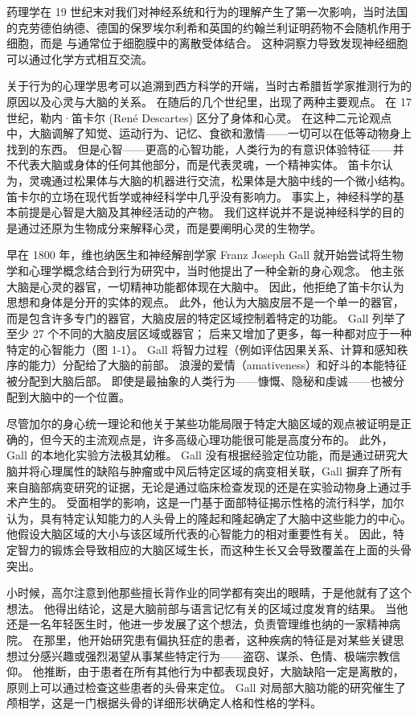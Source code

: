 药理学在 19 世纪末对我们对神经系统和行为的理解产生了第一次影响，当时法国的克劳德伯纳德、德国的保罗埃尔利希和英国的约翰兰利证明药物不会随机作用于细胞，而是 与通常位于细胞膜中的离散受体结合。 
这种洞察力导致发现神经细胞可以通过化学方式相互交流。


关于行为的心理学思考可以追溯到西方科学的开端，当时古希腊哲学家推测行为的原因以及心灵与大脑的关系。
在随后的几个世纪里，出现了两种主要观点。 
在 17 世纪，勒内·笛卡尔 (René Descartes) 区分了身体和心灵。 
在这种二元论观点中，大脑调解了知觉、运动行为、记忆、食欲和激情——一切可以在低等动物身上找到的东西。
但是心智——更高的心智功能，人类行为的有意识体验特征——并不代表大脑或身体的任何其他部分，而是代表灵魂，一个精神实体。 
笛卡尔认为，灵魂通过松果体与大脑的机器进行交流，松果体是大脑中线的一个微小结构。 
笛卡尔的立场在现代哲学或神经科学中几乎没有影响力。 事实上，神经科学的基本前提是心智是大脑及其神经活动的产物。 
我们这样说并不是说神经科学的目的是通过还原为生物成分来解释心灵，而是要阐明心灵的生物学。


早在 1800 年，维也纳医生和神经解剖学家 Franz Joseph Gall 就开始尝试将生物学和心理学概念结合到行为研究中，当时他提出了一种全新的身心观念。 
他主张大脑是心灵的器官，一切精神功能都体现在大脑中。 
因此，他拒绝了笛卡尔认为思想和身体是分开的实体的观点。 
此外，他认为大脑皮层不是一个单一的器官，而是包含许多专门的器官，大脑皮层的特定区域控制着特定的功能。 
Gall 列举了至少 27 个不同的大脑皮层区域或器官； 后来又增加了更多，每一种都对应于一种特定的心智能力（图 1-1）。 
Gall 将智力过程（例如评估因果关系、计算和感知秩序的能力）分配给了大脑的前部。 
浪漫的爱情（amativeness）和好斗的本能特征被分配到大脑后部。 
即使是最抽象的人类行为——慷慨、隐秘和虔诚——也被分配到大脑中的一个位置。


尽管加尔的身心统一理论和他关于某些功能局限于特定大脑区域的观点被证明是正确的，但今天的主流观点是，许多高级心理功能很可能是高度分布的。 
此外，Gall 的本地化实验方法极其幼稚。 
Gall 没有根据经验定位功能，而是通过研究大脑并将心理属性的缺陷与肿瘤或中风后特定区域的病变相关联，Gall 摒弃了所有来自脑部病变研究的证据，无论是通过临床检查发现的还是在实验动物身上通过手术产生的。 
受面相学的影响，这是一门基于面部特征揭示性格的流行科学，加尔认为，具有特定认知能力的人头骨上的隆起和隆起确定了大脑中这些能力的中心。 
他假设大脑区域的大小与该区域所代表的心智能力的相对重要性有关。 
因此，特定智力的锻炼会导致相应的大脑区域生长，而这种生长又会导致覆盖在上面的头骨突出。


小时候，高尔注意到他那些擅长背作业的同学都有突出的眼睛，于是他就有了这个想法。 
他得出结论，这是大脑前部与语言记忆有关的区域过度发育的结果。 
当他还是一名年轻医生时，他进一步发展了这个想法，负责管理维也纳的一家精神病院。 
在那里，他开始研究患有偏执狂症的患者，这种疾病的特征是对某些关键思想过分感兴趣或强烈渴望从事某些特定行为——盗窃、谋杀、色情、极端宗教信仰。 
他推断，由于患者在所有其他行为中都表现良好，大脑缺陷一定是离散的，原则上可以通过检查这些患者的头骨来定位。 
Gall 对局部大脑功能的研究催生了颅相学，这是一门根据头骨的详细形状确定人格和性格的学科。


